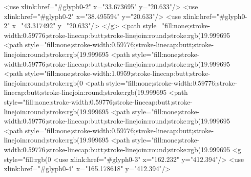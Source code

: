   <use xlink:href="#glyph0-2" x="33.673695" y="20.633"/>
  <use xlink:href="#glyph0-2" x="38.495594" y="20.633"/>
  <use xlink:href="#glyph0-2" x="43.317492" y="20.633"/>
</g>
<path style="fill:none;stroke-width:0.59776;stroke-linecap:butt;stroke-linejoin:round;stroke:rgb(19.999695%
<path style="fill:none;stroke-width:0.59776;stroke-linecap:butt;stroke-linejoin:round;stroke:rgb(19.999695%
<path style="fill:none;stroke-width:0.59776;stroke-linecap:butt;stroke-linejoin:round;stroke:rgb(19.999695%
<path style="fill:none;stroke-width:1.0959;stroke-linecap:butt;stroke-linejoin:round;stroke:rgb(0%
<path style="fill:none;stroke-width:0.59776;stroke-linecap:butt;stroke-linejoin:round;stroke:rgb(19.999695%
<path style="fill:none;stroke-width:0.59776;stroke-linecap:butt;stroke-linejoin:round;stroke:rgb(19.999695%
<path style="fill:none;stroke-width:0.59776;stroke-linecap:butt;stroke-linejoin:round;stroke:rgb(19.999695%
<path style="fill:none;stroke-width:0.59776;stroke-linecap:butt;stroke-linejoin:round;stroke:rgb(19.999695%
<path style="fill:none;stroke-width:0.59776;stroke-linecap:butt;stroke-linejoin:round;stroke:rgb(19.999695%
<g style="fill:rgb(0%
  <use xlink:href="#glyph0-3" x="162.232" y="412.394"/>
  <use xlink:href="#glyph0-4" x="165.178618" y="412.394"/>
